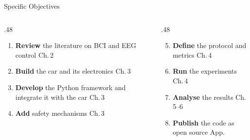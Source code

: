 \documentclass[aspectratio=169,11pt]{beamer}
\begin{document}
\begin{frame}{Specific Objectives}
  \small
  \begin{columns}[T]
    \begin{column}{.48\textwidth}
      \begin{enumerate}
        \item \textbf{Review} the literature on BCI and EEG control \hfill{\color{muted}Ch.\,2}
        \item \textbf{Build} the car and its electronics \hfill{\color{muted}Ch.\,3}
        \item \textbf{Develop} the Python framework and integrate it with the car \hfill{\color{muted}Ch.\,3}
        \item \textbf{Add} safety mechanisms \hfill{\color{muted}Ch.\,3}
      \end{enumerate}
    \end{column}
    \begin{column}{.48\textwidth}
      \begin{enumerate}\setcounter{enumi}{4}
        \item \textbf{Define} the protocol and metrics \hfill{\color{muted}Ch.\,4}
        \item \textbf{Run} the experiments \hfill{\color{muted}Ch.\,4}
        \item \textbf{Analyse} the results \hfill{\color{muted}Ch.\,5--6}
        \item \textbf{Publish} the code as open source \hfill{\color{muted}App.}
      \end{enumerate}
    \end{column}
  \end{columns}
\end{frame}
\end{document}
